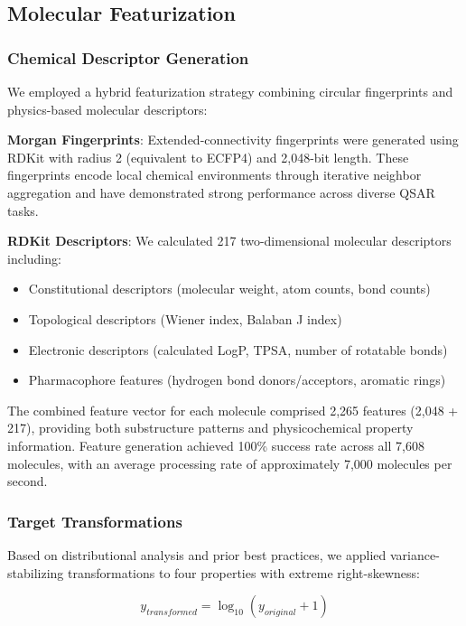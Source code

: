 \documentclass[11pt,a4paper]{article}
\begin{document}
\subsection{Molecular Featurization}

\subsubsection{Chemical Descriptor Generation}

We employed a hybrid featurization strategy combining circular fingerprints and physics-based molecular descriptors:

\textbf{Morgan Fingerprints}: Extended-connectivity fingerprints were generated using RDKit with radius 2 (equivalent to ECFP4) and 2,048-bit length. These fingerprints encode local chemical environments through iterative neighbor aggregation and have demonstrated strong performance across diverse QSAR tasks.

\textbf{RDKit Descriptors}: We calculated 217 two-dimensional molecular descriptors including:
\begin{itemize}
    \item Constitutional descriptors (molecular weight, atom counts, bond counts)
    \item Topological descriptors (Wiener index, Balaban J index)
    \item Electronic descriptors (calculated LogP, TPSA, number of rotatable bonds)
    \item Pharmacophore features (hydrogen bond donors/acceptors, aromatic rings)
\end{itemize}

The combined feature vector for each molecule comprised 2,265 features (2,048 + 217), providing both substructure patterns and physicochemical property information. Feature generation achieved 100\% success rate across all 7,608 molecules, with an average processing rate of approximately 7,000 molecules per second.

\subsubsection{Target Transformations}

Based on distributional analysis and prior best practices, we applied variance-stabilizing transformations to four properties with extreme right-skewness:

\begin{equation}
y_{transformed} = \log_{10}(y_{original} + 1)
\end{equation}
\end{document}
